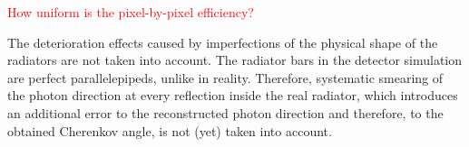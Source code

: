 \textcolor{red}{How uniform is the pixel-by-pixel efficiency?}

The deterioration effects caused by imperfections of the physical shape of the radiators are not taken into account. The radiator bars in the detector simulation are perfect parallelepipeds, unlike in reality. Therefore, systematic smearing of the photon direction at every reflection inside the real radiator, which introduces an additional error to the reconstructed photon direction and therefore, to the obtained Cherenkov angle, is not (yet) taken into account.
